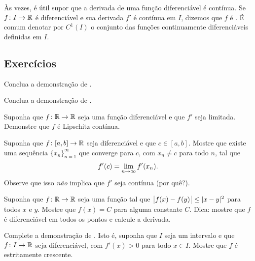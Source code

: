 Às vezes, é útil supor que a derivada de uma função diferenciável é contínua. Se $f \colon I \to {\mathbb{R}}$ é diferenciável e sua derivada $f'$ é contínua em $I$, dizemos que $f$ é \emph{}. É comum denotar por $C^1(I)$ o conjunto das funções continuamente diferenciáveis definidas em $I$.

\subsection{Exercícios}

\begin{exercise}
Conclua a demonstração de .
\end{exercise}

\begin{exercise}
Conclua a demonstração de .
\end{exercise}

\begin{exercise} \label{exercise:boundeddermeanslip}
Suponha que $f \colon {\mathbb{R}} \to {\mathbb{R}}$ seja uma função diferenciável e que $f'$ seja limitada. Demonstre que $f$ é Lipschitz contínua.
\end{exercise}

\begin{exercise}
\pagebreak[1]
Suponha que $f \colon [a,b] \to {\mathbb{R}}$ seja diferenciável e que $c \in [a,b]$. Mostre que existe uma sequência $\{ x_n \}_{n=1}^\infty$ que converge para $c$, com $x_n \neq c$ para todo $n$, tal que
\begin{equation*}
f'(c) = \lim_{n\to \infty} f'(x_n).
\avoidbreak
\end{equation*}
Observe que isso \emph{não} implica que $f'$ seja contínua (por quê?).
\end{exercise}

\begin{exercise}
Suponha que $f \colon {\mathbb{R}} \to {\mathbb{R}}$ seja uma função tal que $\bigl\lvert {f(x)-f(y)} \bigr\rvert \leq \lvert {x-y} \rvert^2$ para todos $x$ e $y$. Mostre que $f(x)=C$ para alguma constante $C$. Dica: mostre que $f$ é diferenciável em todos os pontos e calcule a derivada.
\end{exercise}

\begin{exercise} \label{exercise:posderincr}
Complete a demonstração de . Isto é, suponha que $I$ seja um intervalo e que $f \colon I \to {\mathbb{R}}$ seja diferenciável, com $f'(x)>0$ para todo $x \in I$. Mostre que $f$ é estritamente crescente.
\end{exercise}


